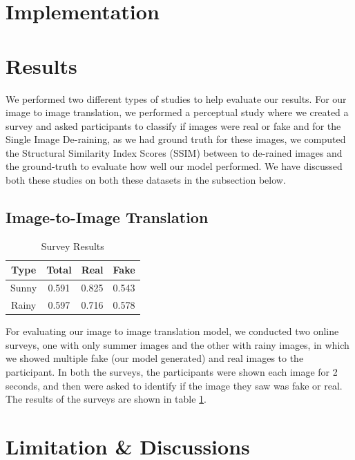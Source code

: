 \documentclass{article}
\begin{document}
\section{Implementation}

\section{Results}

We performed two different types of studies to help evaluate our results. For our image to image translation, we performed a perceptual study where we created a survey and asked participants to classify if images were real or fake and for the Single Image De-raining, as we had ground truth for these images, we computed the Structural Similarity Index Scores (SSIM) between to de-rained images and the ground-truth to evaluate how well our model performed. We have discussed both these studies on both these datasets in the subsection below.

\subsection{Image-to-Image Translation}

\begin{table} [h!]
\centering
\begin{tabular}{ | c | c | c | c |}
\hline
 Type & Total & Real & Fake \\ 
\hline
 Sunny &  0.591 & 0.825 & 0.543 \\  
 Rainy & 0.597 & 0.716 & 0.578 \\
 \hline
\end{tabular}
\caption{Survey Results}
\label{table:1}
\end{table}

For evaluating our image to image translation model, we conducted two online surveys, one with only summer images and the other with rainy images, in which we showed multiple fake (our model generated) and real images to the participant. In both the surveys, the participants were shown each image for 2 seconds, and then were asked to identify if the image they saw was fake or real. The results of the surveys are shown in table \ref{table:1}.




\section{Limitation \& Discussions}
\end{document}
